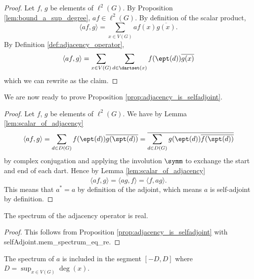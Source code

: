 \begin{proof}
  Let $f$, $g$ be elements of $\ell^2(G)$.
  By Proposition \ref{lem:bound_a_sup_degree}, $a f \in \ell^2(G)$.
  By definition of the scalar product,
  \begin{equation}
    \langle af, g \rangle
    = \sum_{x \in V(G)} af(x) \overline{g(x)}.
  \end{equation}
  By Definition \ref{def:adjacency_operator},
  \begin{equation}
    \langle af, g \rangle
    = \sum_{x \in V(G)}
    \sum_{d \in \dartset(x)}
    f(\ept(d)) \overline{g(x)}
  \end{equation}
  which we can rewrite as the claim.
\end{proof}

We are now ready to prove Proposition \ref{prop:adjacency_is_selfadjoint}.

\begin{proof}
  Let $f$, $g$ be elements of $\ell^2(G)$.
  We have by Lemma \ref{lem:scalar_of_adjacency}
  \begin{equation*}
    \langle af, g \rangle
    = \sum_{d \in D(G)}
    f(\ept(d)) \overline{g(\spt(d))}
    = \overline{\sum_{d \in D(G)}
    g(\ept(d)) \overline{f(\spt(d))}}
  \end{equation*}
  by complex conjugation and applying the involution $\symm$ to exchange the
  start and end of each dart.
  Hence by Lemma \ref{lem:scalar_of_adjacency}
  \begin{equation*}
    \langle af, g \rangle
    = \overline{\langle ag, f \rangle} = \langle f, ag \rangle.
  \end{equation*}
  This means that $a^*=a$ by definition of
  the adjoint, which means $a$ is self-adjoint by definition.
\end{proof}

\begin{corollary}
  \label{cor:spectrum_is_real}
  The spectrum of the adjacency operator is real.
\end{corollary}

\begin{proof}
  This follows from Proposition \ref{prop:adjacency_is_selfadjoint} with
  selfAdjoint.mem\_spectrum\_eq\_re.
\end{proof}

\begin{lemma}
  \label{lem:spectrum_in_segment}
  The spectrum of $a$ is included in the
  segment $[-D,D]$ where $D = \sup_{x \in V(G)} \deg(x)$.
\end{lemma}

